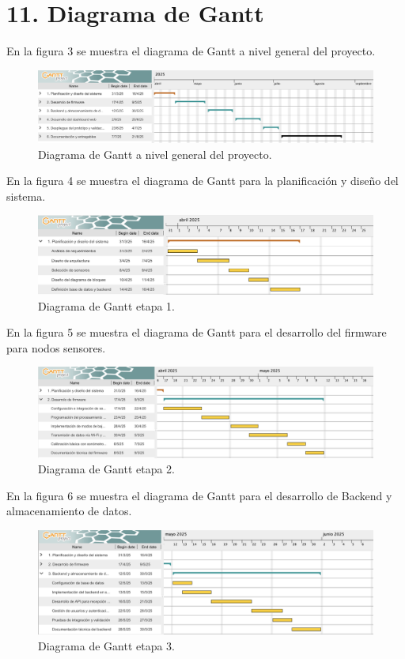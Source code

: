 \documentclass[
11pt, %
]{charter}
\begin{document}
\section{11. Diagrama de Gantt}
\label{sec:gantt}
En la figura 3 se muestra el diagrama de Gantt a nivel general del proyecto.
\begin{figure}[htpb]
    \centering 
    \includegraphics[width=1.05\textwidth]{./Figuras/gantt1.png}
    \caption{Diagrama de Gantt a nivel general del proyecto.}
    \label{fig:AoN}
    \end{figure}

En la figura 4 se muestra el diagrama de Gantt para la planificación y diseño del sistema.
\begin{figure}[htpb]
    \centering 
    \includegraphics[width=1.05\textwidth]{./Figuras/gantt2.png}
    \caption{Diagrama de Gantt etapa 1.}
    \label{fig:AoN}
    \end{figure}

En la figura 5 se muestra el diagrama de Gantt para el desarrollo del firmware para nodos sensores.
\begin{figure}[htpb]
    \centering 
    \includegraphics[width=1.05\textwidth]{./Figuras/gantt3.png}
    \caption{Diagrama de Gantt etapa 2.}
    \label{fig:AoN}
    \end{figure}

En la figura 6 se muestra el diagrama de Gantt para el desarrollo de Backend y almacenamiento de datos.
\begin{figure}[htpb]
    \centering 
    \includegraphics[width=1.05\textwidth]{./Figuras/gantt4.png}
    \caption{Diagrama de Gantt etapa 3.}
    \label{fig:AoN}
    \end{figure}
\end{document}
